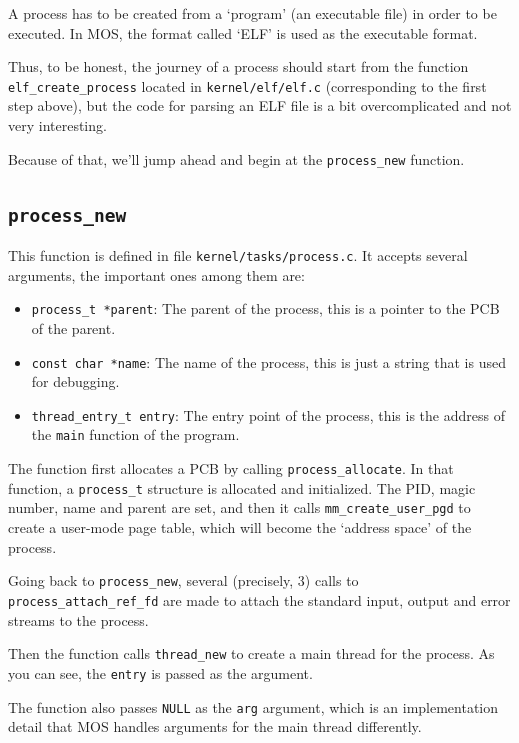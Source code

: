 A process has to be created from a `program' (an executable file) in order to be executed.
In MOS, the format called `ELF' is used as the executable format.

Thus, to be honest, the journey of a process should start from the function \texttt{elf\_create\_process}
located in \texttt{kernel/elf/elf.c} (corresponding to the first step above), but the code for
parsing an ELF file is a bit overcomplicated and not very interesting.

Because of that, we'll jump ahead and begin at the \texttt{process\_new} function.

\subsection{\texttt{process\_new}}

This function is defined in file \texttt{kernel/tasks/process.c}. It accepts several arguments,
the important ones among them are:

\begin{itemize}
    \item \texttt{process\_t *parent}: The parent of the process, this is a pointer to the PCB of the parent.
    \item \texttt{const char *name}: The name of the process, this is just a string that is used for debugging.
    \item \texttt{thread\_entry\_t entry}: The entry point of the process, this is the address of the
          \texttt{main} function of the program.
\end{itemize}

The function first allocates a PCB by calling \texttt{process\_allocate}. In that function, a
\texttt{process\_t} structure is allocated and initialized. The PID, magic number, name and
parent are set, and then it calls \texttt{mm\_create\_user\_pgd} to create a user-mode page table,
which will become the `address space' of the process.

Going back to \texttt{process\_new}, several (precisely, 3) calls to \texttt{process\_attach\_ref\_fd}
are made to attach the standard input, output and error streams to the process.

Then the function calls \texttt{thread\_new} to create a main thread for the process. As you can see,
the \texttt{entry} is passed as the argument.

\begin{note}
    \item The function also passes \texttt{NULL} as the \texttt{arg} argument, which is an implementation
    detail that MOS handles arguments for the main thread differently.
\end{note}

